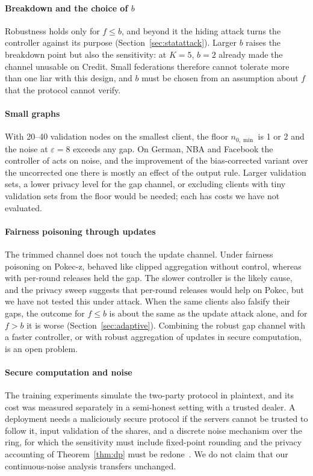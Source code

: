 \paragraph{Breakdown and the choice of $b$}
Robustness holds only for $f\le b$, and beyond it the hiding attack turns the controller against its purpose (Section~\ref{sec:statattack}). Larger $b$ raises the breakdown point but also the sensitivity: at $K=5$, $b=2$ already made the channel unusable on Credit. Small federations therefore cannot tolerate more than one liar with this design, and $b$ must be chosen from an assumption about $f$ that the protocol cannot verify.

\paragraph{Small graphs}
With 20--40 validation nodes on the smallest client, the floor $n_{0,\min}$ is 1 or 2 and the noise at $\varepsilon=8$ exceeds any gap. On German, NBA and Facebook the controller of \rt{} acts on noise, and the improvement of the bias-corrected variant over the uncorrected one there is mostly an effect of the output rule. Larger validation sets, a lower privacy level for the gap channel, or excluding clients with tiny validation sets from the floor would be needed; each has costs we have not evaluated.

\paragraph{Fairness poisoning through updates}
The trimmed channel does not touch the update channel. Under fairness poisoning on Pokec-z, \rt{} behaved like clipped aggregation without control, whereas \clamp{} with per-round releases held the gap. The slower controller is the likely cause, and the privacy sweep suggests that per-round releases would help on Pokec, but we have not tested this under attack. When the same clients also falsify their gaps, the outcome for $f\le b$ is about the same as the update attack alone, and for $f>b$ it is worse (Section~\ref{sec:adaptive}). Combining the robust gap channel with a faster controller, or with robust aggregation of updates in secure computation, is an open problem.

\paragraph{Secure computation and noise}
The training experiments simulate the two-party protocol in plaintext, and its cost was measured separately in a semi-honest setting with a trusted dealer. A deployment needs a maliciously secure protocol if the servers cannot be trusted to follow it, input validation of the shares, and a discrete noise mechanism over the ring, for which the sensitivity must include fixed-point rounding and the privacy accounting of Theorem~\ref{thm:dp} must be redone~\citep{canonne2020discrete,kairouz2021distributed}. We do not claim that our continuous-noise analysis transfers unchanged.

